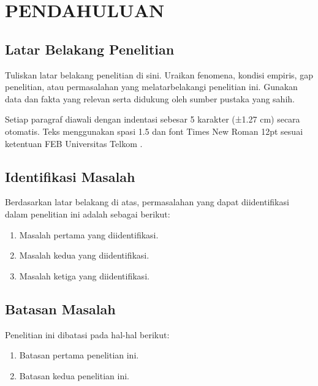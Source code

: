 
\chapter{PENDAHULUAN}
\label{bab:pendahuluan}

\section{Latar Belakang Penelitian}
\label{sec:latar-belakang}

Tuliskan latar belakang penelitian di sini. Uraikan fenomena, kondisi empiris, gap
penelitian, atau permasalahan yang melatarbelakangi penelitian ini. Gunakan data
dan fakta yang relevan serta didukung oleh sumber pustaka yang sahih.

Setiap paragraf diawali dengan indentasi sebesar 5 karakter (±1.27 cm) secara otomatis.
Teks menggunakan spasi 1.5 dan font Times New Roman 12pt sesuai ketentuan FEB
Universitas Telkom \cite{contohSumber2025}.

\section{Identifikasi Masalah}
\label{sec:identifikasi-masalah}

Berdasarkan latar belakang di atas, permasalahan yang dapat diidentifikasi dalam
penelitian ini adalah sebagai berikut:

\begin{enumerate}
  \item Masalah pertama yang diidentifikasi.
  \item Masalah kedua yang diidentifikasi.
  \item Masalah ketiga yang diidentifikasi.
\end{enumerate}

\section{Batasan Masalah}
\label{sec:batasan-masalah}

Penelitian ini dibatasi pada hal-hal berikut:

\begin{enumerate}
  \item Batasan pertama penelitian ini.
  \item Batasan kedua penelitian ini.
\end{enumerate}


